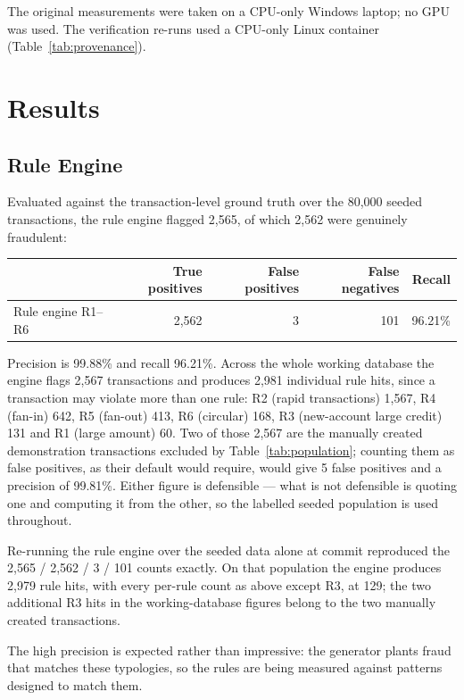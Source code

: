 The original measurements were taken on a CPU-only Windows laptop; no GPU was used. The verification re-runs used a CPU-only Linux container (Table~\ref{tab:provenance}).

\section{Results}

\subsection{Rule Engine}
Evaluated against the transaction-level ground truth over the 80,000 seeded transactions, the rule engine flagged 2,565, of which 2,562 were genuinely fraudulent:

\begin{table}[H]
\centering
\small
\begin{tabular}{@{}lrrrr@{}}
\toprule
 & \textbf{True positives} & \textbf{False positives} & \textbf{False negatives} & \textbf{Recall} \\
\midrule
Rule engine R1--R6 & 2,562 & 3 & 101 & 96.21\% \\
\bottomrule
\end{tabular}
\end{table}

Precision is 99.88\% and recall 96.21\%. Across the whole working database the engine flags 2,567 transactions and produces 2,981 individual rule hits, since a transaction may violate more than one rule: R2 (rapid transactions) 1,567, R4 (fan-in) 642, R5 (fan-out) 413, R6 (circular) 168, R3 (new-account large credit) 131 and R1 (large amount) 60. Two of those 2,567 are the manually created demonstration transactions excluded by Table~\ref{tab:population}; counting them as false positives, as their default  would require, would give 5 false positives and a precision of 99.81\%. Either figure is defensible --- what is not defensible is quoting one and computing it from the other, so the labelled seeded population is used throughout.

Re-running the rule engine over the seeded data alone at commit  reproduced the 2,565 / 2,562 / 3 / 101 counts exactly. On that population the engine produces 2,979 rule hits, with every per-rule count as above except R3, at 129; the two additional R3 hits in the working-database figures belong to the two manually created transactions.

The high precision is expected rather than impressive: the generator plants fraud that matches these typologies, so the rules are being measured against patterns designed to match them.


